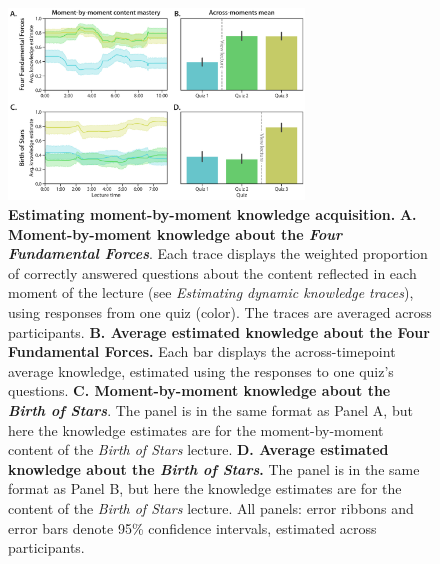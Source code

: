\documentclass[10pt]{article}
\begin{document}
\begin{figure}[tp]
    \centering
    \includegraphics[width=0.7\textwidth]{figs/content-mastery}
    
    \caption{\textbf{Estimating moment-by-moment knowledge acquisition.}
    \textbf{A. Moment-by-moment knowledge about the \textit{Four Fundamental
    Forces}}. Each trace displays the weighted proportion of correctly answered
    questions about the content reflected in each moment of the lecture (see
    \textit{Estimating dynamic knowledge traces}), using responses from one
    quiz (color). The traces are averaged across participants. \textbf{B.
    Average estimated knowledge about the \textbf{Four Fundamental Forces}.}
    Each bar displays the across-timepoint average knowledge, estimated using
    the responses to one quiz's questions. \textbf{C. Moment-by-moment
    knowledge about the \textit{Birth of Stars}}. The panel is in the same
    format as Panel A, but here the knowledge estimates are for the
    moment-by-moment content of the \textit{Birth of Stars} lecture. \textbf{D.
    Average estimated knowledge about the \textit{Birth of Stars}.} The panel
    is in the same format as Panel B, but here the knowledge estimates are for
    the content of the \textit{Birth of Stars} lecture. All panels: error
    ribbons and error bars denote 95\% confidence intervals, estimated across
    participants.}
    
    \label{fig:knowledge-timeseries}
\end{figure}
\end{document}
